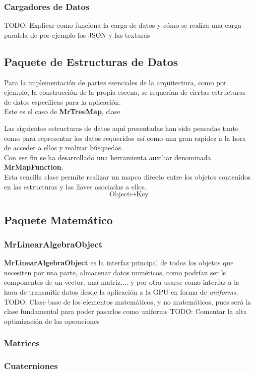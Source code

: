 \subsubsection{Cargadores de Datos}
TODO: Explicar como funciona la carga de datos y cómo se realiza una carga paralela de por ejemplo los JSON y las texturas

\subsection{Paquete de Estructuras de Datos}
Para la implementación de partes esenciales de la arquitectura, como por ejemplo, la construcción de la propia escena, se requerían de ciertas estructuras de datos específicas para la aplicación.\\
Este es el caso de \textbf{MrTreeMap}, clase 

Las siguientes estructuras de datos aquí presentadas han sido pensadas tanto como para representar los datos requeridos así como una gran rapidez a la hora de acceder a ellos y realizar búsquedas.\\
Con ese fin se ha desarrollado una herramienta auxiliar denominada \textbf{MrMapFunction}.\\
Esta sencilla clase permite realizar un mapeo directo entre los objetos contenidos en las estructuras y las llaves asociadas a ellos.
$$\text{Object}\mapsto \text{Key}$$

\subsection{Paquete Matemático}
\subsubsection{MrLinearAlgebraObject}
\textbf{MrLinearAlgebraObject} es la interfaz principal de todos los objetos que necesiten por una parte, almacenar datos numéricos, como podrían ser ls componentes de un vector, una matriz,... y por otra usarse como interfaz a la hora de transmitir datos desde la aplicación a la GPU en forma de \textit{uniforms}.
TODO: Clase base de los elementos matemáticos, y no matemáticos, pues será la clase fundamental para poder pasarlos como uniforms
TODO: Comentar la alta optimización de las operaciones
\subsubsection{Matrices}
\subsubsection{Cuaterniones}
